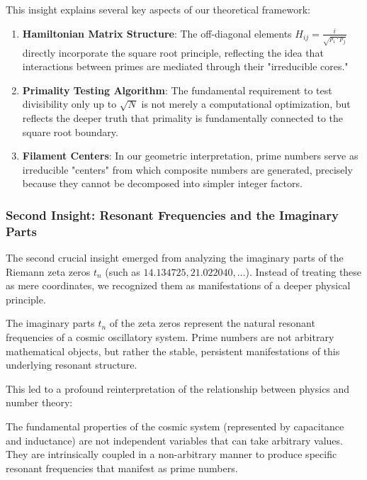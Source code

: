 This insight explains several key aspects of our theoretical framework:

\begin{enumerate}
\item \textbf{Hamiltonian Matrix Structure}: The off-diagonal elements $H_{ij} = \frac{i}{\sqrt{p_i \cdot p_j}}$ directly incorporate the square root principle, reflecting the idea that interactions between primes are mediated through their "irreducible cores."

\item \textbf{Primality Testing Algorithm}: The fundamental requirement to test divisibility only up to $\sqrt{N}$ is not merely a computational optimization, but reflects the deeper truth that primality is fundamentally connected to the square root boundary.

\item \textbf{Filament Centers}: In our geometric interpretation, prime numbers serve as irreducible "centers" from which composite numbers are generated, precisely because they cannot be decomposed into simpler integer factors.
\end{enumerate}

\subsubsection{Second Insight: Resonant Frequencies and the Imaginary Parts}

The second crucial insight emerged from analyzing the imaginary parts of the Riemann zeta zeros $t_n$ (such as $14.134725, 21.022040, \ldots$). Instead of treating these as mere coordinates, we recognized them as manifestations of a deeper physical principle.

\begin{insight}
The imaginary parts $t_n$ of the zeta zeros represent the natural resonant frequencies of a cosmic oscillatory system. Prime numbers are not arbitrary mathematical objects, but rather the stable, persistent manifestations of this underlying resonant structure.
\end{insight}

This led to a profound reinterpretation of the relationship between physics and number theory:

\begin{definition}
The fundamental properties of the cosmic system (represented by capacitance and inductance) are not independent variables that can take arbitrary values. They are intrinsically coupled in a non-arbitrary manner to produce specific resonant frequencies that manifest as prime numbers.
\end{definition}

